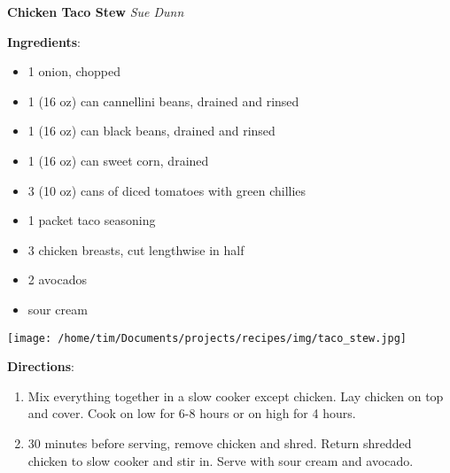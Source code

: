 \documentclass[11pt, twoside, openany]{book}
\begin{document}
\noindent\begin{minipage}[t]{\linewidth}%
{\Large\textbf{Chicken Taco Stew}} \label{chicken-taco-stew}\hfill\textit{Sue Dunn}\\
\noindent\begin{minipage}[t]{0.78\linewidth}%
\textbf{Ingredients}:\vspace{-3mm}
\begin{multicols}{2}
\begin{itemize}\setlength\itemsep{-1mm}
\item 1 onion, chopped
\item 1 (16 oz) can cannellini beans, drained and rinsed
\item 1 (16 oz) can black beans, drained and rinsed
\item 1 (16 oz) can sweet corn, drained
\item 3 (10 oz) cans of diced tomatoes with green chillies
\item 1 packet taco seasoning
\item 3 chicken breasts, cut lengthwise in half
\item 2 avocados
\item sour cream
\end{itemize}
\end{multicols}
\end{minipage}
\noindent\begin{minipage}[t]{0.18\linewidth}
\centering \strut\vspace*{-\baselineskip}\newline
\texttt{[image: /home/tim/Documents/projects/recipes/img/taco\_stew.jpg]}\\
\end{minipage}\vspace{3mm}
\textbf{Directions}:
\vspace{-3mm}\begin{enumerate}\setlength\itemsep{-1mm}
\item Mix everything together in a slow cooker except chicken. Lay chicken on top and cover. Cook on low for 6-8 hours or on high for 4 hours.
\item 30 minutes before serving, remove chicken and shred. Return shredded chicken to slow cooker and stir in. Serve with sour cream and avocado.
\end{enumerate}
\end{minipage}\vspace{8mm}
\end{document}
